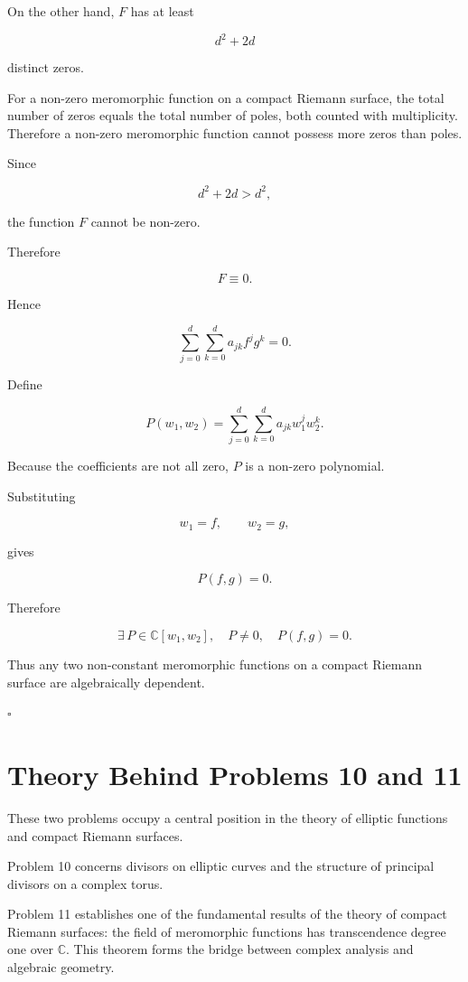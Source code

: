 \documentclass[12pt,a4paper]{article}
\theoremstyle{notespace}
\begin{document}
On the other hand, \(F\) has at least

\[
d^2+2d
\]

distinct zeros.

For a non-zero meromorphic function on a compact Riemann surface, the total number of zeros equals the total number of poles, both counted with multiplicity. Therefore a non-zero meromorphic function cannot possess more zeros than poles.

Since

\[
d^2+2d>d^2,
\]

the function \(F\) cannot be non-zero.

Therefore

\[
F\equiv 0.
\]

Hence

\[
\sum_{j=0}^{d}
\sum_{k=0}^{d}
a_{jk}
f^j g^k
=
0.
\]

Define

\[
P(w_1,w_2)
=
\sum_{j=0}^{d}
\sum_{k=0}^{d}
a_{jk}
w_1^j w_2^k.
\]

Because the coefficients are not all zero, \(P\) is a non-zero polynomial.

Substituting

\[
w_1=f,
\qquad
w_2=g,
\]

gives

\[
P(f,g)=0.
\]

Therefore

\[
\boxed{
	\exists\,P\in\mathbb C[w_1,w_2],
	\quad
	P\neq 0,
	\quad
	P(f,g)=0.
}
\]

Thus any two non-constant meromorphic functions on a compact Riemann surface are algebraically dependent.

\hfill\(\square\)	
	
\section{Theory Behind Problems 10 and 11}

These two problems occupy a central position in the theory of elliptic functions and compact Riemann surfaces.

Problem 10 concerns divisors on elliptic curves and the structure of principal divisors on a complex torus.

Problem 11 establishes one of the fundamental results of the theory of compact Riemann surfaces: the field of meromorphic functions has transcendence degree one over \(\mathbb C\). This theorem forms the bridge between complex analysis and algebraic geometry.
\end{document}
